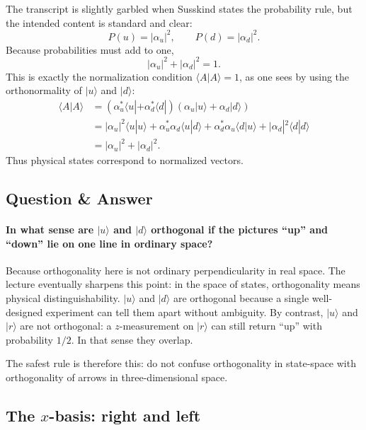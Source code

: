 The transcript is slightly garbled when Susskind states the probability rule, but the intended content is standard and clear:
\begin{equation}
P(u)=|\alpha_u|^2,\qquad P(d)=|\alpha_d|^2.
\end{equation}
Because probabilities must add to one,
\begin{equation}
|\alpha_u|^2+|\alpha_d|^2=1.
\end{equation}
This is exactly the normalization condition \(\langle A|A\rangle=1\), as one sees by using the orthonormality of \(|u\rangle\) and \(|d\rangle\):
\begin{align}
\langle A|A\rangle
&=
(\alpha_u^*\langle u|+\alpha_d^*\langle d|)
(\alpha_u|u\rangle+\alpha_d|d\rangle)\\
&=
|\alpha_u|^2\langle u|u\rangle
+\alpha_u^*\alpha_d\langle u|d\rangle
+\alpha_d^*\alpha_u\langle d|u\rangle
+|\alpha_d|^2\langle d|d\rangle\\
&=
|\alpha_u|^2+|\alpha_d|^2.
\end{align}
Thus physical states correspond to normalized vectors.

\subsection{Question \& Answer}

\paragraph{In what sense are \(|u\rangle\) and \(|d\rangle\) orthogonal if the pictures ``up'' and ``down'' lie on one line in ordinary space?}

Because orthogonality here is not ordinary perpendicularity in real space. The lecture eventually sharpens this point: in the space of states, orthogonality means physical distinguishability. \(|u\rangle\) and \(|d\rangle\) are orthogonal because a single well-designed experiment can tell them apart without ambiguity. By contrast, \(|u\rangle\) and \(|r\rangle\) are not orthogonal: a \(z\)-measurement on \(|r\rangle\) can still return ``up'' with probability \(1/2\). In that sense they overlap.

The safest rule is therefore this: do not confuse orthogonality in state-space with orthogonality of arrows in three-dimensional space.

\subsection{The \(x\)-basis: right and left}

